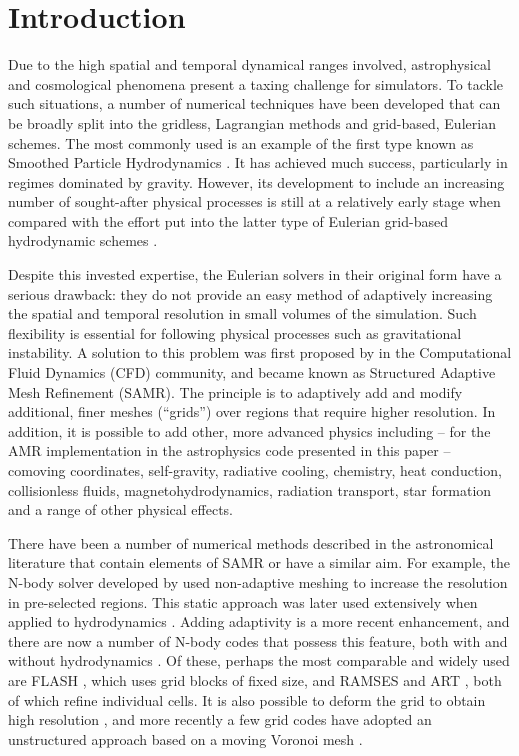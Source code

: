 \section{Introduction}\label{sec.intro}

Due to the high spatial and temporal dynamical ranges involved,
astrophysical and cosmological phenomena present a taxing challenge for
simulators. To tackle such situations, a number of numerical
techniques have been developed that can be broadly split into the
gridless, Lagrangian methods and grid-based, Eulerian schemes. The
most commonly used is an example of the first type known as Smoothed
Particle Hydrodynamics \citep[SPH;][]{Lucy77, SPH}. It has achieved
much success, particularly in regimes dominated by gravity. However,
its development to include an increasing number of sought-after
physical processes is still at a relatively early stage when compared
with the effort put into the latter type of Eulerian grid-based
hydrodynamic schemes \citep[e.g.,][]{laney-1998, toro-1997,
Woodward84}.

Despite this invested expertise, the Eulerian solvers in their
original form have a serious drawback: they do not provide an easy
method of adaptively increasing the spatial and temporal resolution in
small volumes of the simulation. Such flexibility is essential for
following physical processes such as gravitational instability. A
solution to this problem was first proposed by \citet{Berger89} in the
Computational Fluid Dynamics (CFD) community, and became known as
Structured Adaptive Mesh Refinement (SAMR). The principle is to
adaptively add and modify additional, finer meshes (``grids'') over
regions that require higher resolution. In addition, it is possible to
add other, more advanced physics including -- for the AMR
implementation in the astrophysics code presented in this paper --
comoving coordinates, self-gravity, radiative cooling, chemistry, heat
conduction, collisionless fluids, magnetohydrodynamics, radiation
transport, star formation and a range of other physical effects.
\newpage

There have been a number of numerical methods described in the
astronomical literature that contain elements of SAMR or have a
similar aim. For example, the N-body solver developed by
\citet{Villumsen89} used non-adaptive meshing to increase the
resolution in pre-selected regions. This static approach was later
used extensively when applied to hydrodynamics
\citep[e.g.,][]{Ruffert94, Anninos94}. Adding adaptivity is a more
recent enhancement, and there are now a number of N-body codes that
possess this feature, both with and without hydrodynamics
\citep{Couchman91, Jessop94, Suisalu95, Splinter96, Gelato97, ART97,
Truelove98, flash_method, MLAPM01, Yahagi01, RAMSES, Quilis04,
Ziegler05, Zhang06, Astrobear09, Pluto-amr, GAMER, Nyx}. Of these,
perhaps the most comparable and widely used are FLASH
\citep{flash_method}, which uses grid blocks of fixed size, and RAMSES
\citep{RAMSES} and ART \citep{ART97}, both of which refine individual
cells. It is also possible to deform the grid to obtain high
resolution \citep[e.g.,][]{Gnedin95, Xu97, Pen98}, and more recently a
few grid codes have adopted an unstructured approach based on a moving
Voronoi mesh \citep{Arepo10, Tess11}.

